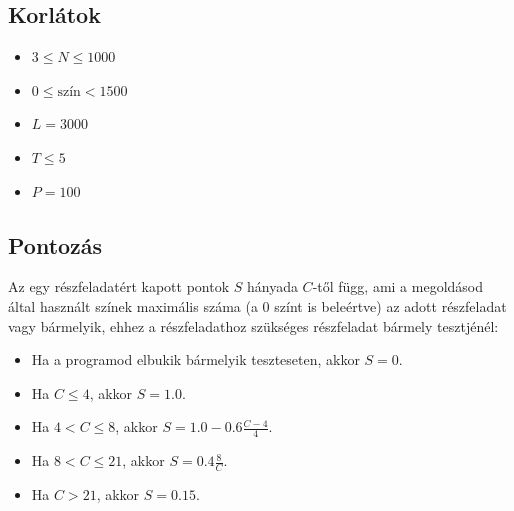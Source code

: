 \documentclass[12pt]{article}
\begin{document}
\subsection{Korlátok}

\begin{itemize}
\item $3 \leq N \leq 1000$
\item $0 \leq \mathrm{szín} < 1500$
\item $L = 3000$
\item $T \leq 5$
\item $P = 100$
\end{itemize}

\subsection{Pontozás}

Az egy részfeladatért kapott pontok $S$ hányada $C$-től függ, ami a megoldásod által használt színek maximális száma (a $0$ színt is beleértve) az adott részfeladat vagy bármelyik, ehhez a részfeladathoz szükséges részfeladat bármely tesztjénél:

\begin{itemize}
\item Ha a programod elbukik bármelyik teszteseten, akkor $S = 0$.
\item Ha $C \leq 4$, akkor $S = 1.0$.
\item Ha $4 < C \leq 8$, akkor $S = 1.0 - 0.6 \frac{C - 4}{4}$.
\item Ha $8 < C \leq 21$, akkor $S = 0.4 \frac{8}{C}$.
\item Ha $C > 21$, akkor $S = 0.15$.
\end{itemize}

\end{document}

